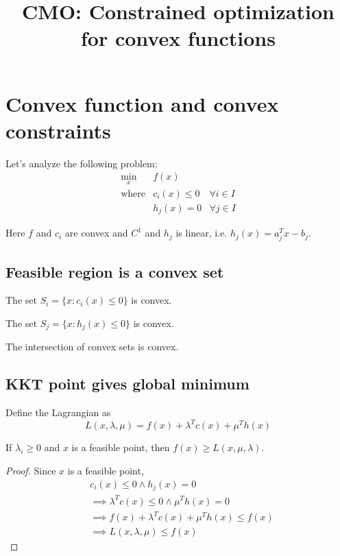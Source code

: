 


\title{CMO: Constrained optimization for convex functions}



\maketitle
\initMinimal{}

\section{Convex function and convex constraints}

Let's analyze the following problem:
\[ \begin{array}{lll}
\min_x & f(x) \\
\textrm{where} & c_i(x) \le 0 & \forall i \in I \\
& h_j(x) = 0 & \forall j \in I
\end{array} \]

Here $f$ and $c_i$ are convex and $C^1$ and $h_j$ is linear, i.e. $h_j(x) = a_j^Tx - b_j$.

\subsection{Feasible region is a convex set}

\begin{lemma}[Homework]
The set $S_i = \{x: c_i(x) \le 0\}$ is convex.
\end{lemma}
\begin{lemma}[Homework]
The set $S_j = \{x: h_j(x) \le 0\}$ is convex.
\end{lemma}
\begin{lemma}[Homework]
The intersection of convex sets is convex.
\end{lemma}

\subsection{KKT point gives global minimum}

Define the Lagrangian as
\[ L(x, \lambda, \mu) = f(x) + \lambda^Tc(x) + \mu^Th(x) \]

\begin{lemma}
\label{thm:f-ge-lagr}
If $\lambda_i \ge 0$ and $x$ is a feasible point, then $f(x) \ge L(x, \mu, \lambda)$.
\end{lemma}
\begin{proof}
Since $x$ is a feasible point,
\begin{align*}
& c_i(x) \le 0 \wedge h_j(x) = 0
\\ &\implies \lambda^Tc(x) \le 0 \wedge \mu^Th(x) = 0
\\ &\implies f(x) + \lambda^Tc(x) + \mu^Th(x) \le f(x)
\\ &\implies L(x, \lambda, \mu) \le f(x)
\end{align*}
\end{proof}


